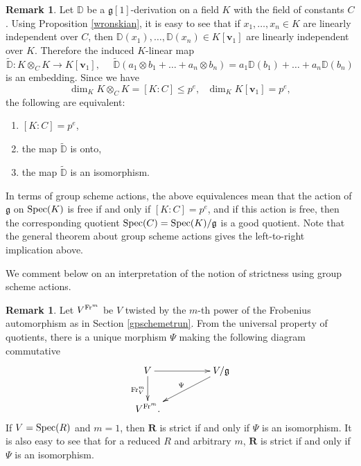 \documentclass[10pt]{amsart}
\theoremstyle{definition}
\newtheorem{remark}[theorem]{Remark}
\begin{document}
\begin{remark}\label{actioncom}
Let $\mathbb{D}$ be a $\mathfrak{g}[1]$-derivation on a field $K$ with the field of constants $C$. Using Proposition \ref{wronskian}, it is easy to see that if $x_1,\ldots,x_n\in K$ are linearly independent over $C$, then $\mathbb{D}(x_1),\ldots,\mathbb{D}(x_n)\in K[\mathbf{v}_1]$ are linearly independent over $K$. Therefore the induced $K$-linear map
$$\widetilde{\mathbb{D}}:K\otimes_CK\to K[\mathbf{v}_1],\ \ \ \ \ \ \widetilde{\mathbb{D}}(a_1\otimes b_1+\ldots+a_n\otimes b_n)=a_1\mathbb{D}(b_1)+\ldots+a_n\mathbb{D}(b_n)$$
is an embedding. Since we have
$$\dim_KK\otimes_CK=[K:C]\leqslant p^e,\ \ \ \dim_KK[\mathbf{v}_1]=p^e,$$
the following are equivalent:
\begin{enumerate}
\item $[K:C]=p^e$,

\item the map $\widetilde{\mathbb{D}}$ is onto,

\item the map $\widetilde{\mathbb{D}}$ is an isomorphism.
\end{enumerate}
\noindent
In terms of group scheme actions, the above equivalences mean that the action of $\mathfrak{g}$ on $\operatorname{Spec}(K)$ is free if and only if $[K:C]=p^e$, and if this action is free, then the corresponding quotient $\operatorname{Spec}(C)=\operatorname{Spec}(K)/\mathfrak{g}$ is a good quotient. Note that the general theorem about group scheme actions \cite[Thm 1(B), p. 112]{MuAbel} gives the left-to-right implication above.
\end{remark}
\noindent
We comment below on an interpretation of the notion of strictness using group scheme actions.
\begin{remark}\label{factorstrict}
Let $V^{\operatorname{Fr}^m}$ be $V$ twisted by the $m$-th power of the Frobenius automorphism as in Section \ref{gpschemetrun}. From the universal property of quotients, there is a unique morphism $\Psi$ making the following diagram commutative
\begin{equation*}
\xymatrixcolsep{4pc}
\xymatrix{V \ar[d]_{\fr^m_V} \ar[r]^{}& V/\mathfrak{g} \ar[dl]_{\Psi}\\
	   V^{\fr^m} .  }
\end{equation*}
If $V=\operatorname{Spec}(R)$ and $m=1$, then $\mathbf{R}$ is strict if and only if $\Psi$ is an isomorphism. It is also easy to see that for a reduced $R$ and arbitrary $m$,  $\mathbf{R}$ is strict if and only if $\Psi$ is an isomorphism.
\end{remark}
\end{document}
